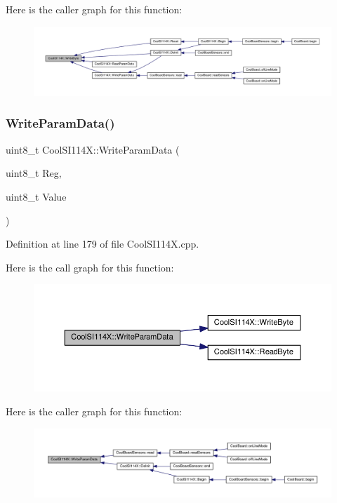 Here is the caller graph for this function\+:
\nopagebreak
\begin{figure}[H]
\begin{center}
\leavevmode
\includegraphics[width=350pt]{class_cool_s_i114_x_ac5c8dc5ade604da7a1c8cd1586feefc2_icgraph}
\end{center}
\end{figure}
\mbox{\label{class_cool_s_i114_x_abf45eb10a6de1be16e68a51624fa2608}} 
\subsubsection{\texorpdfstring{Write\+Param\+Data()}{WriteParamData()}}
{\footnotesize\ttfamily uint8\+\_\+t Cool\+S\+I114\+X\+::\+Write\+Param\+Data (\begin{DoxyParamCaption}\item[{uint8\+\_\+t}]{Reg,  }\item[{uint8\+\_\+t}]{Value }\end{DoxyParamCaption})}



Definition at line 179 of file Cool\+S\+I114\+X.\+cpp.

Here is the call graph for this function\+:
\nopagebreak
\begin{figure}[H]
\begin{center}
\leavevmode
\includegraphics[width=350pt]{class_cool_s_i114_x_abf45eb10a6de1be16e68a51624fa2608_cgraph}
\end{center}
\end{figure}
Here is the caller graph for this function\+:
\nopagebreak
\begin{figure}[H]
\begin{center}
\leavevmode
\includegraphics[width=350pt]{class_cool_s_i114_x_abf45eb10a6de1be16e68a51624fa2608_icgraph}
\end{center}
\end{figure}


